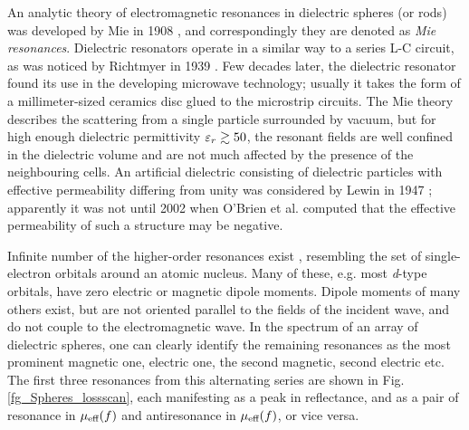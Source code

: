 An analytic theory of electromagnetic resonances in dielectric spheres (or rods) was developed by Mie in 1908 \cite{mie1908beitrage}, and correspondingly they are denoted as \textit{Mie resonances}. 
Dielectric resonators operate in a similar way to a series L-C circuit, as was noticed by Richtmyer in 1939 \cite{richtmyer1939dielectric}. Few decades later, the dielectric resonator found its use in the developing microwave technology; usually it takes the form of a millimeter-sized ceramics disc glued to the microstrip circuits. 
The Mie theory describes the scattering from a single particle surrounded by vacuum, but for high enough dielectric permittivity $\varepsilon_r \gtrsim 50$, the resonant fields are well confined in the dielectric volume and are not much affected by the presence of the neighbouring cells.
An artificial dielectric consisting of dielectric particles with effective permeability differing from unity was considered by Lewin in 1947 \cite{lewin1947electrical}; apparently it was not until 2002 when O'Brien et al. computed \cite{obrien2002photonic} that the effective permeability of such a structure may be negative.
\label{negn_diel}


Infinite number of the higher-order resonances exist \cite[pp. 407-408]{mie1908beitrage}, resembling the set of single-electron orbitals around an atomic nucleus. Many of these, e.g. most \textit{d}-type orbitals, have zero electric or magnetic dipole moments. Dipole moments of many others exist, but are not oriented parallel to the fields of the incident wave, and do not couple to the electromagnetic wave. In the spectrum of an array of dielectric spheres, one can clearly identify the remaining resonances as the most prominent magnetic one, electric one, the second magnetic, second electric etc. The first three resonances from this alternating series are shown in Fig. \ref{fg_Spheres_lossscan}, each manifesting as a peak in reflectance, and as a pair of resonance in $\mu_{\text{eff} }(f)$ and antiresonance in $\mu_{\text{eff} }(f)$, or vice versa.


